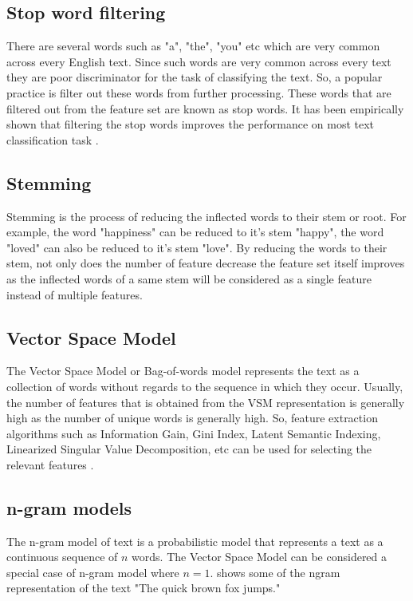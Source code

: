 \subsection{Stop word filtering}
There are several words such as "a", "the", "you" etc which are very common across every English text. Since such words are very common across every text they are poor discriminator for the task of classifying the text. So, a popular practice is filter out these words from further processing. These words that are filtered out from the feature set are known as stop words. It has been empirically shown that filtering the stop words improves the performance on most text classification task \cite{silva2003importance}.

\subsection{Stemming}
Stemming is the process of reducing the inflected words to their stem or root. For example, the word "happiness" can be reduced to it's stem "happy", the word "loved" can also be reduced to it's stem "love". By reducing the words to their stem, not only does the number of feature decrease the feature set itself improves as the inflected words of a same stem will be considered as a single feature instead of multiple features. 

\subsection{Vector Space Model}
The Vector Space Model or Bag-of-words model represents the text as a collection of words without regards to the sequence in which they occur. Usually, the number of features that is obtained from the VSM representation is generally high as the number of unique words is generally high. So, feature extraction algorithms such as Information Gain, Gini Index, Latent Semantic Indexing, Linearized Singular Value Decomposition, etc can be used for selecting the relevant features \cite{aggarwal2012survey}.

\subsection{n-gram models}
The n-gram model of text is a probabilistic model that represents a text as a continuous sequence of $n$ words. The Vector Space Model can be considered a special case of n-gram model where $n=1$.  shows some of the ngram representation of the text "The quick brown fox jumps."

